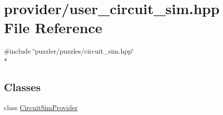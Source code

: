 \hypertarget{a00135}{}\section{provider/user\+\_\+circuit\+\_\+sim.hpp File Reference}
\label{a00135}
{\ttfamily \#include \char`\"{}puzzler/puzzles/circuit\+\_\+sim.\+hpp\char`\"{}}\\*
\subsection*{Classes}
\begin{DoxyCompactItemize}
\item 
class \hyperlink{a00005}{Circuit\+Sim\+Provider}
\end{DoxyCompactItemize}
